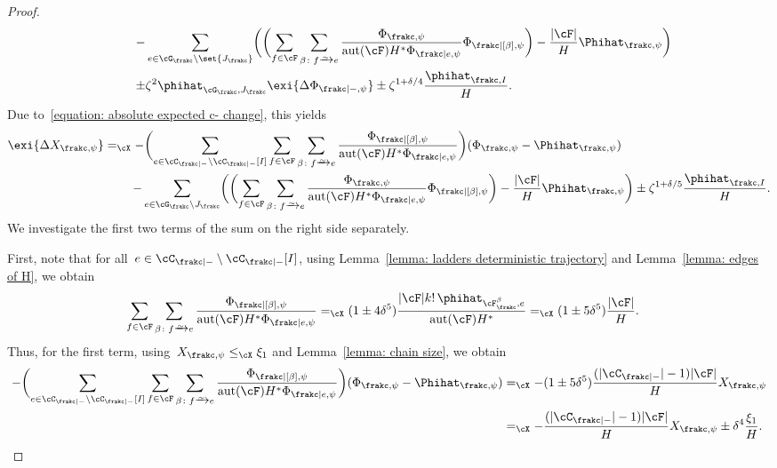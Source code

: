 \documentclass[11pt]{amsart}
\DeclarePairedDelimiter{\paren}{\lparen}{\rparen}
\DeclarePairedDelimiter{\abs}{\lvert}{\rvert}
\newcommand{\Xleq}{\leq_{\cX}}
\newcommand{\Xeq}{=_{\cX}}
\newcommand{\bijection}{\mathchoice
	{\xrightarrow{\smash{\raisebox{-3pt}{$\scriptstyle\sim$}}}}%
	{\xrightarrow{\smash{\raisebox{-3pt}{$\scriptstyle\sim$}}}}%
	{\xrightarrow{\smash{\raisebox{-2.5pt}{$\scriptscriptstyle\sim$}}}}%
	{\xrightarrow{\smash{\raisebox{-2.5pt}{$\scriptscriptstyle\sim$}}}}%
}
\DeclareMathOperator{\aut}{aut}
\newcommand{\om}{\mathord{-}}
\theoremstyle{definition}
\numberwithin{equation}{section}
\begin{document}
\begin{proof}
\begin{equation*}
\begin{aligned}
				&\hphantom{=}\mathrel{}\quad -\sum_{e\in\cG_\frakc\setminus \set{J_\frakc}}\paren[\bigg]{\paren[\bigg]{ \sum_{f\in\cF}\sum_{\beta\colon f\bijection e}\frac{\Phi_{\frakc,\psi}}{\aut(\cF)H^*\Phi_{\frakc|e,\psi}}\Phi_{\frakc|[\beta],\psi}} -\frac{\abs{\cF}}{H}\Phihat_{\frakc,\psi} } \\&\hphantom{=}\mathrel{}\quad\pm \zeta^2\phihat_{\cG_\frakc,J_\frakc}\exi{\Delta \Phi_{\frakc|\om,\psi}}\pm \zeta^{1+\delta/4}\frac{\phihat_{\frakc,I}}{H}.
			\end{aligned}
		\end{equation*}
		Due to~\eqref{equation: absolute expected c- change}, this yields
		\begin{equation}\label{equation: chain deviation two terms}
			\begin{aligned}
				\exi{\Delta X_{\frakc,\psi}}
				&\Xeq -\paren[\bigg]{\sum_{e\in\cC_{\frakc|\om}\setminus \cC_{\frakc|\om}[I]}\sum_{f\in\cF}\sum_{\beta\colon f\bijection e}\frac{\Phi_{\frakc|[\beta],\psi}}{\aut(\cF)H^*\Phi_{\frakc|e,\psi}}}(\Phi_{\frakc,\psi}-\Phihat_{\frakc,\psi})\\
				&\hphantom{=}\mathrel{}\quad -\sum_{e\in\cG_\frakc\setminus J_\frakc}\paren[\bigg]{\paren[\bigg]{ \sum_{f\in\cF}\sum_{\beta\colon f\bijection e}\frac{\Phi_{\frakc,\psi}}{\aut(\cF)H^*\Phi_{\frakc|e,\psi}}\Phi_{\frakc|[\beta],\psi}} -\frac{\abs{\cF}}{H}\Phihat_{\frakc,\psi} } \pm \zeta^{1+\delta/5}\frac{\phihat_{\frakc,I}}{H}.
			\end{aligned}
		\end{equation}
		We investigate the first two terms of the sum on the right side separately.
		
		First, note that for all~$e\in\cC_{\frakc|\om}\setminus\cC_{\frakc|\om}[I]$, using Lemma~\ref{lemma: ladders deterministic trajectory} and Lemma~\ref{lemma: edges of H}, we obtain
		\begin{align*}
			\sum_{f\in\cF}\sum_{\beta\colon f\bijection e}\frac{ \Phi_{\frakc|[\beta],\psi}}{\aut(\cF)H^*\Phi_{\frakc|e,\psi}}
			&\Xeq (1\pm 4\delta^5)\frac{\abs{\cF}k!\, \phihat_{\cF_\frakc^\beta,e} }{\aut(\cF)H^*}
			\Xeq (1\pm 5\delta^5)\frac{\abs{\cF}}{H}.
		\end{align*}
		Thus, for the first term, using~$X_{\frakc,\psi}\Xleq \xi_1$ and Lemma~\ref{lemma: chain size}, we obtain
		\begin{equation}\label{equation: chain deviation first term}
			\begin{aligned}
				-\paren[\bigg]{\sum_{e\in\cC_{\frakc|\om}\setminus \cC_{\frakc|\om}[I]}\sum_{f\in\cF}\sum_{\beta\colon f\bijection e}\frac{\Phi_{\frakc|[\beta],\psi}}{\aut(\cF)H^*\Phi_{\frakc|e,\psi}}}(\Phi_{\frakc,\psi}-\Phihat_{\frakc,\psi})
				&\Xeq -(1\pm 5\delta^5)\frac{(\abs{\cC_{\frakc|\om}}-1)\abs{\cF}}{H}X_{\frakc,\psi}\\
				&\Xeq-\frac{(\abs{\cC_{\frakc|\om}}-1)\abs{\cF}}{H}X_{\frakc,\psi}\pm \delta^4\frac{\xi_1}{H}.
			\end{aligned}
		\end{equation}
		

\end{proof}
\end{document}
